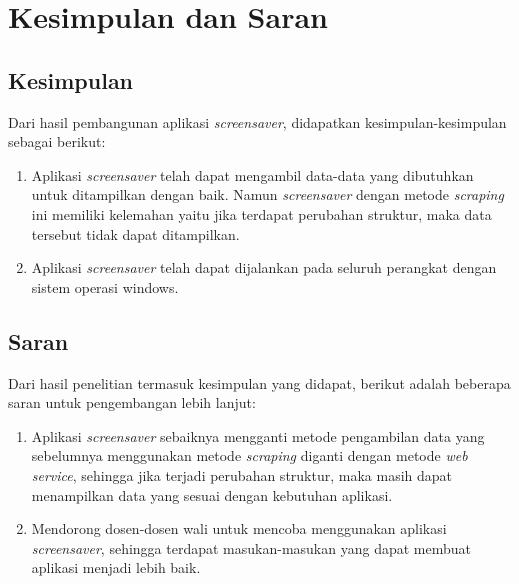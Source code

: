 \chapter{Kesimpulan dan Saran}
\label{chap:kesimpulan_saran}

\section{Kesimpulan}
\label{sec:kesimpulan}
Dari hasil pembangunan aplikasi \textit{screensaver}, didapatkan kesimpulan-kesimpulan sebagai berikut:
\begin{enumerate}
	\item Aplikasi \textit{screensaver} telah dapat mengambil data-data yang dibutuhkan untuk ditampilkan dengan baik. Namun \textit{screensaver} dengan metode \textit{scraping} ini memiliki kelemahan yaitu jika terdapat perubahan struktur, maka data tersebut tidak dapat ditampilkan.
	\item Aplikasi \textit{screensaver} telah dapat dijalankan pada seluruh perangkat dengan sistem operasi windows.
	
\end{enumerate}

\section{Saran}
\label{sec:saran}
Dari hasil penelitian termasuk kesimpulan yang didapat, berikut adalah beberapa saran untuk pengembangan lebih lanjut:
\begin{enumerate}
    \item Aplikasi \textit{screensaver} sebaiknya mengganti metode pengambilan data yang sebelumnya menggunakan metode \textit{scraping} diganti dengan metode \textit{web service}, sehingga jika terjadi perubahan struktur, maka masih dapat menampilkan data yang sesuai dengan kebutuhan aplikasi.
    \item Mendorong dosen-dosen wali untuk mencoba menggunakan aplikasi \textit{screensaver}, sehingga terdapat masukan-masukan yang dapat membuat aplikasi menjadi lebih baik.
\end{enumerate}
